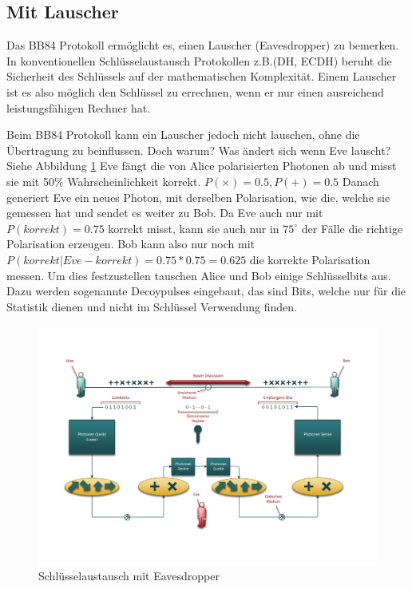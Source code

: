   \subsection{Mit Lauscher}
  Das BB84 Protokoll erm\"oglicht es, einen Lauscher (Eavesdropper) zu bemerken.
  In konventionellen Schl\"usselaustausch Protokollen z.B.(DH, ECDH)
  beruht die Sicherheit des Schl\"ussels auf der mathematischen Komplexit\"at.
  Einem Lauscher ist es also m\"oglich den Schl\"ussel zu errechnen,
  wenn er nur einen ausreichend leistungsf\"ahigen Rechner hat.

  Beim BB84 Protokoll kann ein Lauscher jedoch nicht lauschen, ohne die \"Ubertragung zu beinflussen.
  Doch warum? Was \"andert sich wenn Eve lauscht? Siehe Abbildung \ref{crypto:BB84Eve}
  Eve f\"angt die von Alice polarisierten Photonen ab und misst sie mit 50\% Wahrscheinlichkeit korrekt.
  $P(\times)=0.5, P(+)=0.5$
  Danach generiert Eve ein neues Photon, mit derselben Polarisation,
  wie die, welche sie gemessen hat und sendet es weiter zu Bob.
  Da Eve auch nur mit
  $P(korrekt)=0.75$
  korrekt misst, kann sie auch nur in
  $75^{\circ}$
  der F\"alle die richtige Polarisation erzeugen.
  Bob kann also nur noch mit
  $P(korrekt|Eve-korrekt)=0.75*0.75=0.625$
  die korrekte Polarisation messen.
  Um dies festzustellen tauschen Alice und Bob einige Schl\"usselbits aus.
  Dazu werden sogenannte Decoypulses eingebaut, das sind Bits,
  welche nur f\"ur die Statistik dienen und nicht im Schl\"ussel Verwendung finden.

  \begin{figure}
    \centering
    \includegraphics[height=0.35\textheight]{crypto/BB84Eve.pdf}
    \caption{Schl\"usselaustausch mit Eavesdropper\label{crypto:BB84Eve}}
  \end{figure}

